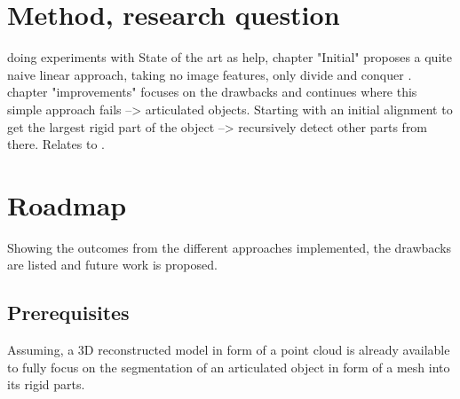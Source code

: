 \section{Method, research question}

doing experiments with State of the art as help, chapter "Initial" proposes a quite naive linear approach, taking no image features, only divide and conquer . chapter "improvements" focuses on the drawbacks and continues where this simple approach fails --> articulated objects. Starting with an initial alignment to get the largest rigid part of the object --> recursively detect other parts from there. Relates to \cite{Mitra}.

\section{Roadmap}
Showing the outcomes from the different approaches implemented, the drawbacks are listed and future work is proposed.

\subsection{Prerequisites}
\label{prerequisites}
Assuming, a 3D reconstructed model in form of a point cloud is already available to fully focus on the segmentation of an articulated object in form of a mesh into its rigid parts.


